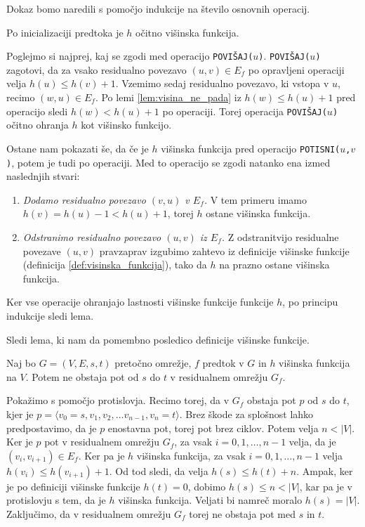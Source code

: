 \documentclass[mat1]{fmfdelo}
\begin{document}
\begin{dokaz}
Dokaz bomo naredili s pomočjo indukcije na število osnovnih operacij.

Po inicializaciji predtoka je $h$ očitno višinska funkcija.

Poglejmo si najprej, kaj se zgodi med operacijo \texttt{POVIŠAJ($u$)}. \texttt{POVIŠAJ($u$)} zagotovi, da za vsako residualno povezavo $(u,v) \in E_f$ po opravljeni operaciji velja $h(u) \leq h(v) +1$. Vzemimo sedaj residualno povezavo, ki vstopa v $u$, recimo $(w,u) \in E_f$. Po lemi \ref{lem:visina_ne_pada} iz $h(w) \leq h(u) + 1$ pred operacijo sledi $h(w) < h(u) + 1$ po operaciji. Torej operacija \texttt{POVIŠAJ($u$)} očitno ohranja $h$ kot višinsko funkcijo.

Ostane nam pokazati še, da če je $h$ višinska funkcija pred operacijo \texttt{POTISNI($u$,$v$)}, potem je tudi po operaciji. Med to operacijo se zgodi natanko ena izmed naslednjih stvari:

\begin{enumerate}
\item \textit{Dodamo residualno povezavo $(v,u)$ v $E_f$.} V tem primeru imamo $h(v) = h(u) - 1 < h(u) + 1$, torej $h$ ostane višinska funkcija.
\item \textit{Odstranimo residualno povezavo $(u,v)$ iz $E_f$.} Z odstranitvijo residualne povezave $(u,v)$ pravzaprav izgubimo zahtevo iz definicije višinske funkcije (definicija \ref{def:visinska_funkcija}), tako da $h$ na prazno ostane višinska funkcija.
\end{enumerate}

Ker vse operacije ohranjajo lastnosti višinske funkcije funkcije $h$, po principu indukcije sledi lema.
\end{dokaz}

Sledi lema, ki nam da pomembno posledico definicije višinske funkcije.

\begin{lema}\label{lem:ni_poti}
Naj bo $G=(V,E,s,t)$ pretočno omrežje, $f$ predtok v $G$ in $h$ višinska funkcija na $V$. Potem ne obstaja pot od $s$ do $t$ v residualnem omrežju $G_f$.
\end{lema}

\begin{dokaz}
Pokažimo s pomočjo protislovja. Recimo torej, da v $G_f$ obstaja pot $p$ od $s$ do $t$, kjer je $p = \langle v_0 = s, v_1, v_2, \dotsc v_{n-1}, v_n = t\rangle$. Brez škode za splošnost lahko predpostavimo, da je $p$ enostavna pot, torej pot brez ciklov. Potem velja $n < |V|$. Ker je $p$ pot v residualnem omrežju $G_f$, za vsak $i = 0, 1, \dotsc, n-1$ velja, da je $(v_i, v_{i+1}) \in E_f$. Ker pa je $h$ višinska funkcija, za vsak $i = 0, 1, \dotsc, n-1$ velja $h(v_i) \leq h(v_{i+1}) + 1$. Od tod sledi, da velja $h(s) \leq h(t) + n$. Ampak, ker je po definiciji višinske funkcije $h(t) = 0$, dobimo $h(s) \leq n < |V|$, kar pa je v protislovju s tem, da je $h$ višinska funkcija. Veljati bi namreč moralo $h(s) = |V|$. Zaključimo, da v residualnem omrežju $G_f$ torej ne obstaja pot med $s$ in $t$.
\end{dokaz}
\end{document}
